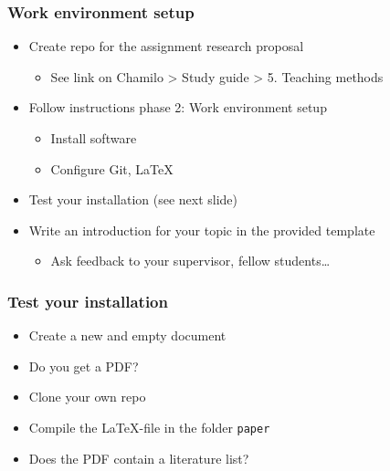 \documentclass[aspectratio=169]{beamer}
\begin{document}
\begin{frame}
  \frametitle{Work environment setup}

  \begin{itemize}
    \item Create repo for the assignment research proposal
      \begin{itemize}
        \item See link on Chamilo > Study guide > 5. Teaching methods
      \end{itemize}
    \item Follow instructions phase 2: Work environment setup
      \begin{itemize}
        \item Install software
        \item Configure Git, \LaTeX
      \end{itemize}
    \item Test your installation (see next slide)
    \item Write an introduction for your topic in the provided template
      \begin{itemize}
        \item Ask feedback to your supervisor, fellow students\ldots
      \end{itemize}
  \end{itemize}
\end{frame}

\begin{frame}
  \frametitle{Test your installation}

  \begin{itemize}
    \item Create a new and empty document
    \item Do you get a PDF?
    \item Clone your own repo
    \item Compile the {\LaTeX}-file in the folder \texttt{paper}
    \item Does the PDF contain a literature list?
  \end{itemize}
\end{frame}
\end{document}
